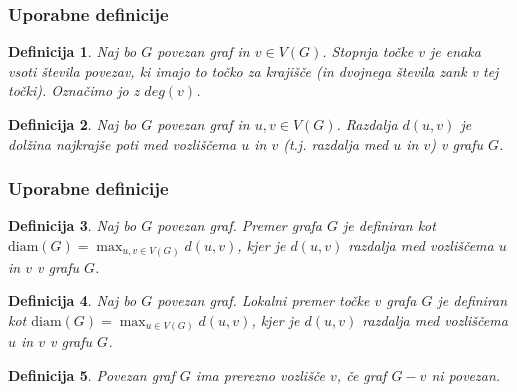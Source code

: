 \documentclass[12pt, hyperref={unicode}]{beamer}
\newtheorem{definicija}{Definicija}
\begin{document}
\begin{frame}
   
    \frametitle{Uporabne definicije}
    \begin{definicija}
    Naj bo $G$ povezan graf in $v \in V(G)$. Stopnja točke $v$ je enaka vsoti števila povezav, ki imajo to točko za krajišče (in dvojnega števila zank v tej točki).
    Označimo jo z $deg(v)$.
    \end{definicija}
    
    \begin{definicija}
    Naj bo $G$ povezan graf in $u, v \in V(G)$. Razdalja $d(u, v)$ je dolžina najkrajše poti med vozliščema $u$ in $v$ (t.j. razdalja med $u$ in $v$) v grafu $G$.
    \end{definicija}

\end{frame}

\begin{frame}
   
    \frametitle{Uporabne definicije}
    \begin{definicija}
    Naj bo $G$ povezan graf. Premer grafa $G$ je definiran kot $\text{diam}(G) = \max_{u, v \in V(G)} d(u, v)$, kjer je $d(u, v)$ razdalja med vozliščema $u$ in $v$ v grafu $G$.
    \end{definicija}
    
    \begin{definicija}
    Naj bo $G$ povezan graf. Lokalni premer točke $v$ grafa $G$ je definiran kot $\text{diam}(G) = \max_{u \in V(G)} d(u, v)$, kjer je $d(u, v)$ razdalja med vozliščema $u$ in $v$ v grafu $G$.
    \end{definicija}
    
    \begin{definicija}
    Povezan graf $G$ ima prerezno vozlišče $v$, če graf $G - v$ ni povezan.
    \end{definicija}

\end{frame}
\end{document}
